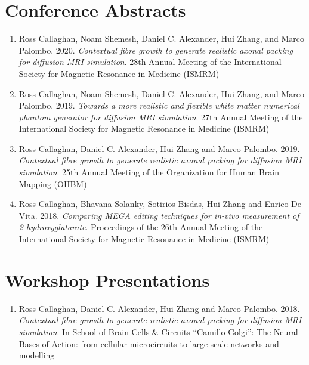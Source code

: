 \section*{Conference Abstracts}
\begin{enumerate}
  \item Ross Callaghan, Noam Shemesh, Daniel C. Alexander, Hui Zhang, and Marco Palombo. 2020. \emph{Contextual fibre growth to generate realistic axonal packing for diffusion MRI simulation}. 28th Annual Meeting of the International Society for Magnetic Resonance in Medicine (ISMRM)
  \item Ross Callaghan, Noam Shemesh, Daniel C. Alexander, Hui Zhang, and Marco Palombo. 2019. \emph{Towards a more realistic and flexible white matter numerical phantom generator for diffusion MRI simulation}. 27th Annual Meeting of the International Society for Magnetic Resonance in Medicine (ISMRM)
  \item Ross Callaghan, Daniel C. Alexander, Hui Zhang and Marco Palombo. 2019. \emph{Contextual fibre growth to generate realistic axonal packing for diffusion MRI simulation}. 25th Annual Meeting of the  Organization for Human Brain Mapping (OHBM)
  \item Ross Callaghan, Bhavana Solanky, Sotirios Bisdas, Hui Zhang and Enrico De Vita. 2018. \emph{Comparing MEGA editing techniques for in-vivo measurement of 2-hydroxyglutarate}. Proceedings of the 26th Annual Meeting of the International Society for Magnetic Resonance in Medicine (ISMRM)
\end{enumerate}



\section*{Workshop Presentations}
\begin{enumerate}
\item Ross Callaghan, Daniel C. Alexander, Hui Zhang and Marco Palombo. 2018. \emph{Contextual fibre growth to generate realistic axonal packing for diffusion MRI simulation}. In School of Brain Cells \& Circuits “Camillo Golgi”: The Neural Bases of Action: from cellular microcircuits to large-scale networks and modelling
\end{enumerate}


